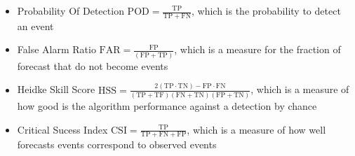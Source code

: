 \begin{itemize}
\item Probability Of Detection $\mathrm{POD} = \frac{\mathrm{TP}}{\mathrm{TP} + \mathrm{FN}}$, which is the probability to detect an event
\item False Alarm Ratio $ \mathrm{FAR} = \frac{\mathrm{FP}}{(\mathrm{FP} + \mathrm{TP})} $, which is a measure for the fraction of forecast that do not become events
\item Heidke Skill Score \citep{Heidke1926} $\mathrm{HSS} = \frac{2 (\mathrm{TP} \cdot \mathrm{TN}) - \mathrm{FP} \cdot \mathrm{FN}}{ (\mathrm{TP} + \mathrm{TF}) (\mathrm{FN} + \mathrm{TN}) (\mathrm{FP} + \mathrm{TN})}$, which is a measure of how good is the algorithm performance against a detection by chance
\item Critical Sucess Index $ \mathrm{CSI} = \frac{\mathrm{TP}}{\mathrm{TP} + \mathrm{FN} + \mathrm{FP}}$, which is a measure of how well forecasts events correspond to observed events 
\end{itemize}